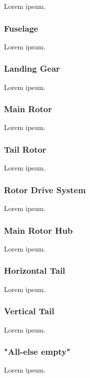 Lorem ipsum. \cite{NASA-TP-2015-218751}

\subsubsection{Fuselage}

Lorem ipsum.

\subsubsection{Landing Gear}

Lorem ipsum.

\subsubsection{Main Rotor}

Lorem ipsum.

\subsubsection{Tail Rotor}

Lorem ipsum.

\subsubsection{Rotor Drive System}

Lorem ipsum.

\subsubsection{Main Rotor Hub}

Lorem ipsum.

\subsubsection{Horizontal Tail}

Lorem ipsum.

\subsubsection{Vertical Tail}

Lorem ipsum.

\subsubsection{"All-else empty"}

Lorem ipsum.
